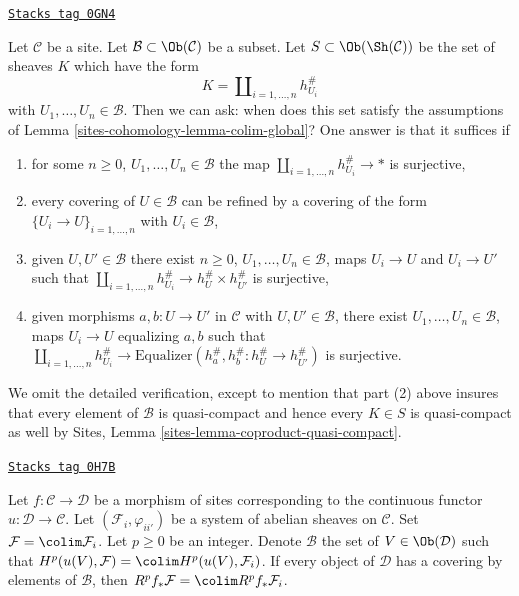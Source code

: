\begin{remark}
\label{sites-cohomology-remark-colim-global}
\href{https://stacks.math.columbia.edu/tag/0GN4}{\texttt{Stacks tag 0GN4}}

Let $\mathcal{C}$ be a site. Let $\mathcal{B} \subset \Ob(\mathcal{C})$
be a subset. Let $S \subset \Ob(\Sh(\mathcal{C}))$
be the set of sheaves $K$ which have the form
$$
K = \coprod\nolimits_{i = 1, \ldots, n} h_{U_i}^\#
$$
with $U_1, \ldots, U_n \in \mathcal{B}$. Then we can
ask: when does this set satisfy the assumptions of
Lemma \ref{sites-cohomology-lemma-colim-global}? One answer is that it suffices if
\begin{enumerate}
\item for some $n \geq 0$, $U_1, \ldots, U_n \in \mathcal{B}$
the map $\coprod_{i = 1, \ldots, n} h_{U_i}^\# \to *$ is surjective,
\item every covering of $U \in \mathcal{B}$ can be refined
by a covering of the form $\{U_i \to U\}_{i = 1, \ldots, n}$
with $U_i \in \mathcal{B}$,
\item given $U, U' \in \mathcal{B}$ there exist $n \geq 0$,
$U_1, \ldots, U_n \in \mathcal{B}$, maps $U_i \to U$ and
$U_i \to U'$ such that $\coprod_{i = 1, \ldots, n} h_{U_i}^\# \to
h_U^\# \times h_{U'}^\#$ is surjective,
\item given morphisms $a, b : U \to U'$ in $\mathcal{C}$ with
$U, U' \in \mathcal{B}$, there exist $U_1, \ldots, U_n \in \mathcal{B}$,
maps $U_i \to U$ equalizing $a, b$ such that
$\coprod_{i = 1, \ldots, n} h_{U_i}^\# \to
\text{Equalizer}(h_a^\#, h_b^\# : h_U^\# \to h_{U'}^\#)$
is surjective.
\end{enumerate}
We omit the detailed verification, except to mention that part (2)
above insures that every element of $\mathcal{B}$ is quasi-compact
and hence every $K \in S$ is quasi-compact as well by
Sites, Lemma \ref{sites-lemma-coproduct-quasi-compact}.
\end{remark}

\begin{lemma}
\label{sites-cohomology-lemma-higher-direct-image-colimit}
\href{https://stacks.math.columbia.edu/tag/0H7B}{\texttt{Stacks tag 0H7B}}

Let $f : \mathcal{C} \to \mathcal{D}$ be a morphism of sites
corresponding to the continuous functor $u : \mathcal{D} \to \mathcal{C}$.
Let $(\mathcal{F}_i, \varphi_{ii'})$ be a system of
abelian sheaves on $\mathcal{C}$. Set $\mathcal{F} = \colim \mathcal{F}_i$.
Let $p \geq 0$ be an integer. Denote $\mathcal{B}$ the set of
$V \in \Ob(\mathcal{D})$ such that
$H^p(u(V), \mathcal{F}) = \colim H^p(u(V), \mathcal{F}_i)$.
If every object of $\mathcal{D}$ has a covering by elements of $\mathcal{B}$,
then $R^pf_*\mathcal{F} = \colim R^pf_*\mathcal{F}_i$.
\end{lemma}

